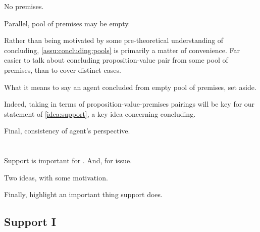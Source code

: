 \begin{note}
  No premises.

  Parallel, pool of premises may be empty.
  

  Rather than being motivated by some pre-theoretical understanding of concluding, \autoref{assu:concluding:pools} is primarily a matter of convenience.
  Far easier to talk about concluding proposition-value pair from some pool of premises, than to cover distinct cases.

  What it means to say an agent concluded from empty pool of premises, set aside.

  Indeed, taking in terms of proposition-value-premises pairings will be key for our statement of \autoref{idea:support}, a key idea concerning concluding.
\end{note}

\begin{note}
  Final, consistency of agent's perspective.
\end{note}

\section{}
\label{cha:clarification:support}

\begin{note}
  \color{red}
  Support is important for \qWhy{}.
  And, for issue.

  Two ideas, with some motivation.

  Finally, highlight an important thing support does.
\end{note}

\subsection{Support I}

